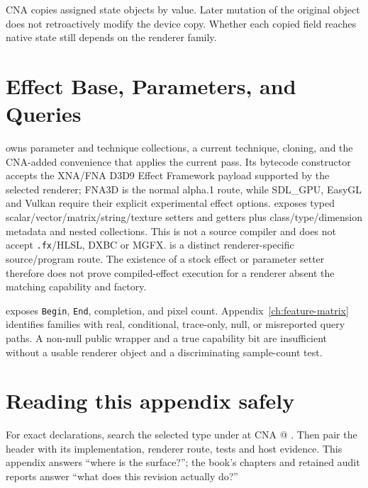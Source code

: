 CNA copies assigned state objects by value.  Later mutation of the original object does not
retroactively modify the device copy.  Whether each copied field reaches native state still
depends on the renderer family.

\section{Effect Base, Parameters, and Queries}
\label{sec:api-buffers-effect-base}

 owns parameter and technique collections, a current technique, cloning, and
the CNA-added convenience that applies the current pass.  Its bytecode constructor accepts the
XNA/FNA D3D9 Effect Framework payload supported by the selected renderer; FNA3D is the normal
alpha.1 route, while SDL\_GPU, EasyGL and Vulkan require their explicit experimental effect
options.   exposes
typed scalar/vector/matrix/string/texture setters and getters plus class/type/dimension metadata
and nested collections.  This is not a source compiler and does not accept \texttt{.fx}/HLSL,
DXBC or MGFX.   is a distinct renderer-specific source/program route.
The existence of a stock effect or parameter setter therefore does not prove compiled-effect
execution for a renderer absent the matching capability and factory.

 exposes \texttt{Begin}, \texttt{End}, completion, and pixel count.
Appendix~\ref{ch:feature-matrix} identifies families with real, conditional, trace-only, null, or
misreported query paths.  A non-null public wrapper and a true capability bit are insufficient
without a usable renderer object and a discriminating sample-count test.

\section{Reading this appendix safely}

For exact declarations, search the selected type under
 at CNA
\CnaEditionTag{} @ \CnaRevision.  Then pair the header with its implementation,
renderer route, tests and host evidence.  This appendix answers ``where is the surface?''; the
book's chapters and retained audit reports answer ``what does this revision actually do?''
